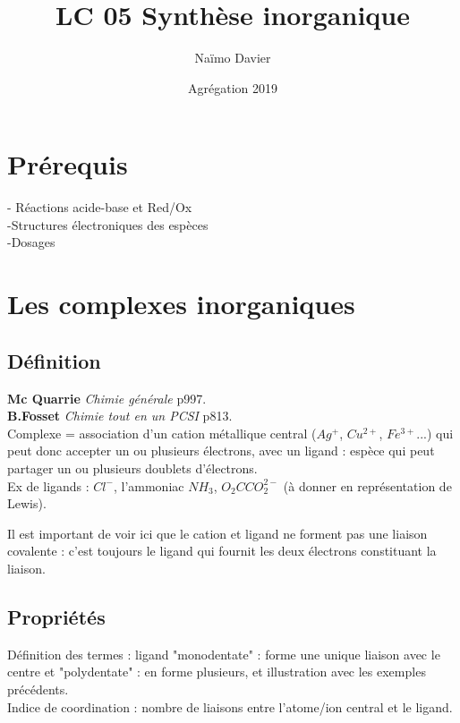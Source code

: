 \documentclass[12pt,prb,aps,epsf]{article}
\begin{document}
	
	\title{LC 05 Synthèse inorganique}
	\author{Naïmo Davier}
	\date{Agrégation 2019}
	
	\maketitle
	
	\tableofcontents
	
	\pagebreak
	


\section{Prérequis}
- Réactions acide-base et Red/Ox\\
-Structures électroniques des espèces\\
-Dosages

\section{Les complexes inorganiques}
\subsection{Définition}
\textbf{Mc Quarrie} \textit{Chimie générale} p997.\\
\textbf{B.Fosset} \textit{Chimie tout en un PCSI} p813.\\

Complexe = association d'un cation métallique central  ($Ag^+$, $Cu^{2+}$, $Fe^{3+}$...) qui peut donc accepter un ou plusieurs électrons, avec un ligand : espèce qui peut partager un ou plusieurs doublets d'électrons.\\
Ex de ligands : $Cl^-$, l'ammoniac $NH_3$, $O_2CCO_2^{2-}$ (à donner en représentation de Lewis).

Il est important de voir ici que le cation et ligand ne forment pas une liaison covalente : c'est toujours le ligand qui fournit les deux électrons constituant la liaison. 
	
\subsection{Propriétés}
Définition des termes : ligand "monodentate" : forme une unique liaison avec le centre et "polydentate" : en forme plusieurs, et illustration avec les exemples précédents.\\
Indice de coordination : nombre de liaisons entre l'atome/ion central et le ligand.\\
\end{document}
